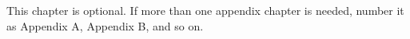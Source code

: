 This chapter is optional. If more than one appendix chapter is needed, number it as Appendix A, Appendix B, and so on.